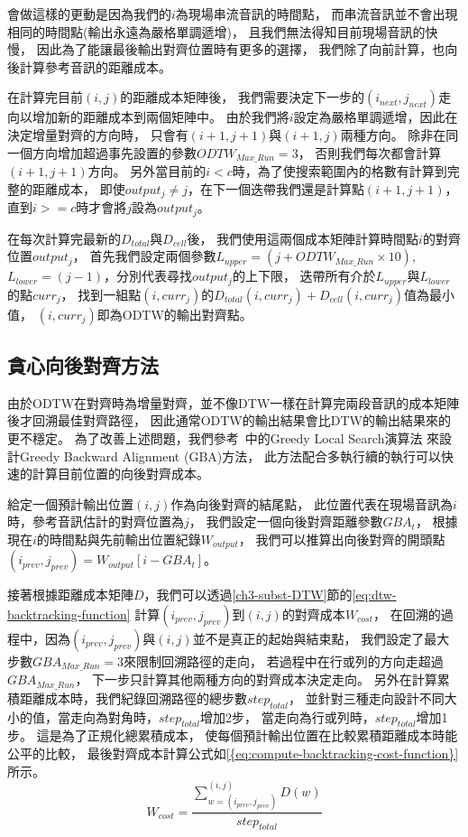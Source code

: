 \documentclass[class=NCU_thesis, crop=false]{standalone}
\begin{document}
會做這樣的更動是因為我們的$i$為現場串流音訊的時間點，
而串流音訊並不會出現相同的時間點(輸出永遠為嚴格單調遞增)，
且我們無法得知目前現場音訊的快慢，
因此為了能讓最後輸出對齊位置時有更多的選擇，
我們除了向前計算，也向後計算參考音訊的距離成本。

在計算完目前$(i, j)$的距離成本矩陣後，
我們需要決定下一步的$(i_{next}, j_{next})$走向以增加新的距離成本到兩個矩陣中。
由於我們將$i$設定為嚴格單調遞增，因此在決定增量對齊的方向時，
只會有$(i+1, j+1)$與$(i+1, j)$兩種方向。
除非在同一個方向增加超過事先設置的參數$ODTW_{Max\_Run} = 3$，
否則我們每次都會計算$(i+1, j+1)$方向。
另外當目前的$i < c$時，為了使搜索範圍內的格數有計算到完整的距離成本，
即使$output_j \neq j$，在下一個迭帶我們還是計算點$(i+1, j+1)$，
直到$i >= c$時才會將$j$設為$output_j$。

在每次計算完最新的$D_{total}$與$D_{cell}$後，
我們使用這兩個成本矩陣計算時間點$i$的對齊位置$output_j$，
首先我們設定兩個參數$L_{upper} = (j+ODTW_{Max\_Run}\times 10)$,
$L_{lower} = (j-1)$，分別代表尋找$output_j$的上下限，
迭帶所有介於$L_{upper}$與$L_{lower}$的點$curr_{j}$，
找到一組點$(i, curr_{j})$的$D_{total}(i, curr_{j})+D_{cell}(i, curr_{j})$值為最小值，
$(i, curr_{j})$即為ODTW的輸出對齊點。

\subsection{貪心向後對齊方法} \label{ch3-subst-GBA}
由於ODTW在對齊時為增量對齊，並不像DTW一樣在計算完兩段音訊的成本矩陣後才回溯最佳對齊路徑，
因此通常ODTW的輸出結果會比DTW的輸出結果來的更不穩定。
為了改善上述問題，我們參考~\cite{Arzt2010Towards}中的Greedy Local Search演算法
來設計Greedy Backward Alignment (GBA)方法，
此方法配合多執行續的執行可以快速的計算目前位置的向後對齊成本。

給定一個預計輸出位置$(i, j)$作為向後對齊的結尾點，
此位置代表在現場音訊為$i$時，參考音訊估計的對齊位置為$j$，
我們設定一個向後對齊距離參數$GBA_{t}$，
根據現在$i$的時間點與先前輸出位置紀錄$W_{output}$，
我們可以推算出向後對齊的開頭點$(i_{prev}, j_{prev}) = W_{output}[i-GBA_{t}]$。

接著根據距離成本矩陣$D$，我們可以透過\ref{ch3-subst-DTW}節的\cref{eq:dtw-backtracking-function}
計算$(i_{prev}, j_{prev})$到$(i, j)$的對齊成本$W_{cost}$，
在回溯的過程中，因為$(i_{prev}, j_{prev})$與$(i, j)$並不是真正的起始與結束點，
我們設定了最大步數$GBA_{Max\_Run}=3$來限制回溯路徑的走向，
若過程中在行或列的方向走超過$GBA_{Max\_Run}$，
下一步只計算其他兩種方向的對齊成本決定走向。
另外在計算累積距離成本時，我們紀錄回溯路徑的總步數$step_{total}$，
並針對三種走向設計不同大小的值，當走向為對角時，$step_{total}$增加2步，
當走向為行或列時，$step_{total}$增加1步。
這是為了正規化總累積成本，
使每個預計輸出位置在比較累積距離成本時能公平的比較，
最後對齊成本計算公式如\cref{{eq:compute-backtracking-cost-function}}所示。
\begin{equation}
    \label{eq:compute-backtracking-cost-function}
    W_{cost} = \frac{\sum_{w = (i_{prev}, j_{prev})}^{(i, j)}D(w)}{step_{total}} 
\end{equation}
\end{document}
